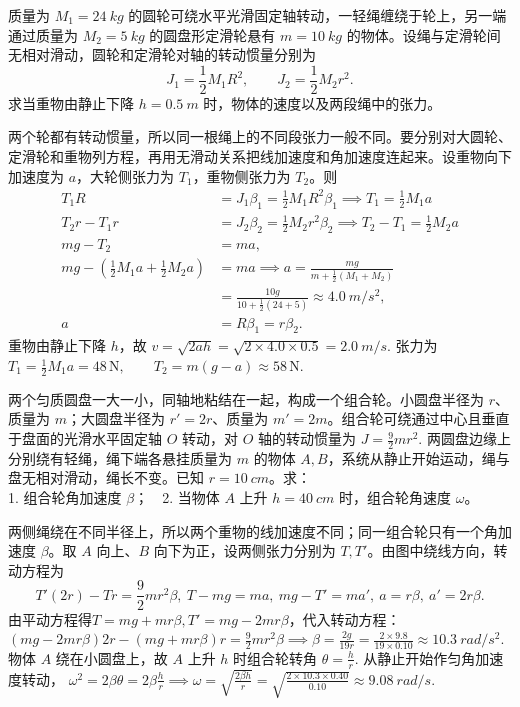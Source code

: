 \documentclass[lang=cn,11pt]{elegantbook}
\begin{document}
\begin{exercise}
质量为 \(M_1=\SI{24}{kg}\) 的圆轮可绕水平光滑固定轴转动，一轻绳缠绕于轮上，另一端通过质量为 \(M_2=\SI{5}{kg}\) 的圆盘形定滑轮悬有 \(m=\SI{10}{kg}\) 的物体。设绳与定滑轮间无相对滑动，圆轮和定滑轮对轴的转动惯量分别为
\[
J_1=\frac12 M_1R^2,\qquad J_2=\frac12 M_2r^2.
\]
求当重物由静止下降 \(h=\SI{0.5}{m}\) 时，物体的速度以及两段绳中的张力。
\end{exercise}
\begin{solution}
两个轮都有转动惯量，所以同一根绳上的不同段张力一般不同。要分别对大圆轮、定滑轮和重物列方程，再用无滑动关系把线加速度和角加速度连起来。设重物向下加速度为 \(a\)，大轮侧张力为 \(T_1\)，重物侧张力为 \(T_2\)。则
\[
\begin{aligned}
T_1R&=J_1\beta_1=\frac12M_1R^2\beta_1\implies T_1=\frac12M_1a\\
T_2r-T_1r&=J_2\beta_2=\frac12M_2r^2\beta_2\implies T_2-T_1=\frac12M_2a\\
mg-T_2&=ma,\\
mg-\left(\frac12M_1a+\frac12M_2a\right)&=ma
\implies
a=\frac{mg}{m+\frac12(M_1+M_2)}\\
&=\frac{10g}{10+\frac12(24+5)}
\approx \SI{4.0}{m/s^2},\\
a&=R\beta_1=r\beta_2.
\end{aligned}
\]
重物由静止下降 \(h\)，故
 \(v=\sqrt{2ah} =\sqrt{2\times4.0\times0.5} =\SI{2.0}{m/s}.\) 
张力为
 \(T_1=\frac12M_1a=48\,\mathrm{N},\qquad T_2=m(g-a)\approx 58\,\mathrm{N}.\) 
\end{solution}

\begin{exercise}
两个匀质圆盘一大一小，同轴地粘结在一起，构成一个组合轮。小圆盘半径为 \(r\)、质量为 \(m\)；大圆盘半径为 \(r'=2r\)、质量为 \(m'=2m\)。组合轮可绕通过中心且垂直于盘面的光滑水平固定轴 \(O\) 转动，对 \(O\) 轴的转动惯量为
 \(J=\frac{9}{2}mr^2.\) 
两圆盘边缘上分别绕有轻绳，绳下端各悬挂质量为 \(m\) 的物体 \(A,B\)，系统从静止开始运动，绳与盘无相对滑动，绳长不变。已知 \(r=\SI{10}{cm}\)。求：\\
1. 组合轮角加速度 \(\beta\)；~~2. 当物体 \(A\) 上升 \(h=\SI{40}{cm}\) 时，组合轮角速度 \(\omega\)。
\end{exercise}
\begin{solution}
两侧绳绕在不同半径上，所以两个重物的线加速度不同；同一组合轮只有一个角加速度 \(\beta\)。取 \(A\) 向上、\(B\) 向下为正，设两侧张力分别为 \(T,T'\)。由图中绕线方向，转动方程为
\[
T'(2r)-Tr=\frac{9}{2}mr^2\beta,~T-mg=ma,~mg-T'=ma',~a=r\beta,~a'=2r\beta.
\]
由平动方程得$T=mg+mr\beta,T'=mg-2mr\beta$，代入转动方程：
 \((mg-2mr\beta)2r-(mg+mr\beta)r =\frac{9}{2}mr^2\beta \implies \beta=\frac{2g}{19r}=\frac{2\times9.8}{19\times0.10} \approx \SI{10.3}{rad/s^2}.\) 
物体 \(A\) 绕在小圆盘上，故 \(A\) 上升 \(h\) 时组合轮转角
 \(\theta=\frac{h}{r}.\) 
从静止开始作匀角加速度转动，
 \(\omega^2=2\beta\theta=2\beta\frac{h}{r}\implies \omega=\sqrt{\frac{2\beta h}{r}} =\sqrt{\frac{2\times10.3\times0.40}{0.10}} \approx \SI{9.08}{rad/s}.\) 
\end{solution}
\end{document}
